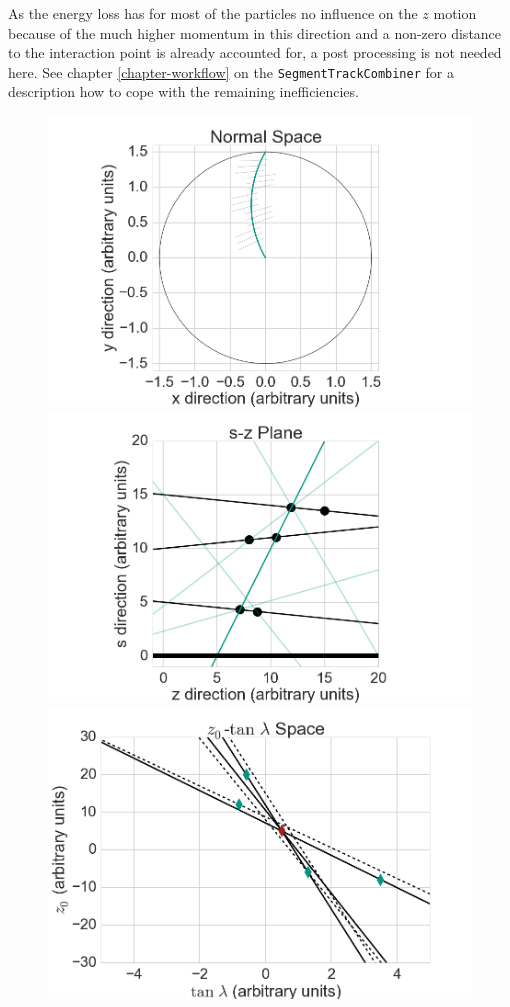 As the energy loss has for most of the particles no influence on the $z$ motion because of the much higher momentum in this direction and a non-zero distance to the interaction point is already accounted for, a post processing is not needed here. See chapter \ref{chapter-workflow} on the \texttt{SegmentTrackCombiner} for a description how to cope with the remaining inefficiencies.


\begin{figure}
 \centering
 \includegraphics[scale=0.15]{figures/theory/stereo_1.png}
 \includegraphics[scale=0.15]{figures/theory/stereo_2.png}
 \includegraphics[scale=0.15]{figures/theory/stereo_3.png}

\end{figure}
